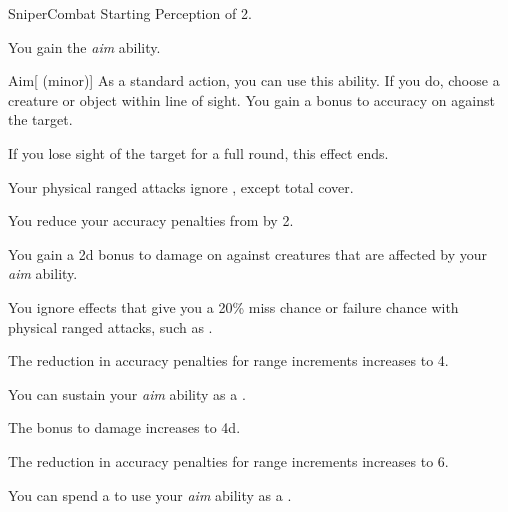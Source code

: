    \begin{feat}{Sniper}{Combat}
        \featpre Starting Perception of 2.

         You gain the \textit{aim} ability.
        \begin{ability}{Aim}[ (minor)]
            As a standard action, you can use this ability.
            If you do, choose a creature or object within line of sight.
            You gain a  bonus to accuracy on  against the target.

            If you lose sight of the target for a full round, this effect ends.
        \end{ability}

         Your physical ranged attacks ignore , except total cover.

         You reduce your accuracy penalties from  by 2.

         You gain a \plus2d bonus to damage on  against \unaware creatures that are affected by your \textit{aim} ability.

         You ignore effects that give you a 20\% miss chance or failure chance with physical ranged attacks, such as .

         The reduction in accuracy penalties for range increments increases to 4.

         You can sustain your \textit{aim} ability as a .

         The bonus to damage increases to \plus4d.

         The reduction in accuracy penalties for range increments increases to 6.

         You can spend a  to use your \textit{aim} ability as a .
    \end{feat}

